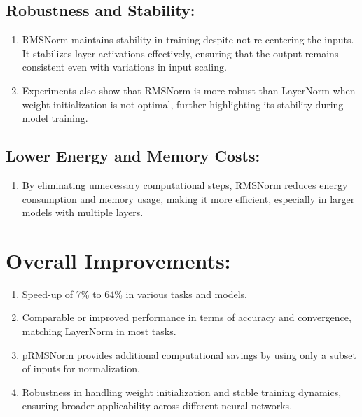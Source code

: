 \documentclass{report}
\begin{document}
	
	\subsection{Robustness and Stability:}
	\begin{enumerate}
		\item 
		RMSNorm maintains stability in training despite not re-centering the inputs. It stabilizes layer activations effectively, ensuring that the output remains consistent even with variations in input scaling.
		
		\item 
		Experiments also show that RMSNorm is more robust than LayerNorm when weight initialization is not optimal, further highlighting its stability during model training.
	\end{enumerate}
	
	
	\subsection{Lower Energy and Memory Costs:}
	\begin{enumerate}
		\item 
		By eliminating unnecessary computational steps, RMSNorm reduces energy consumption and memory usage, making it more efficient, especially in larger models with multiple layers.
	\end{enumerate}
	
	
	
	\section{Overall Improvements:}
	\begin{enumerate}
		\item 
		Speed-up of 7\% to 64\% in various tasks and models.
		
		\item 
		Comparable or improved performance in terms of accuracy and convergence, matching LayerNorm in most tasks.
		
		\item 
		pRMSNorm provides additional computational savings by using only a subset of inputs for normalization.
		
		\item 
		Robustness in handling weight initialization and stable training dynamics, ensuring broader applicability across different neural networks.
	\end{enumerate}
	
\end{document}
